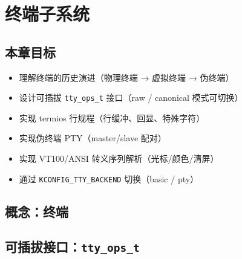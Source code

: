 \chapter{终端子系统}
\label{ch:terminal}

\section{本章目标}

\begin{itemize}
  \item 理解终端的历史演进（物理终端 → 虚拟终端 → 伪终端）
  \item 设计可插拔 \texttt{tty\_ops\_t} 接口（raw / canonical 模式可切换）
  \item 实现 termios 行规程（行缓冲、回显、特殊字符）
  \item 实现伪终端 PTY（master/slave 配对）
  \item 实现 VT100/ANSI 转义序列解析（光标/颜色/清屏）
  \item 通过 \texttt{KCONFIG\_TTY\_BACKEND} 切换（basic / pty）
\end{itemize}

\section{概念：终端}
\label{sec:tty-concept}


\section{可插拔接口：\texttt{tty\_ops\_t}}
\label{sec:tty-interface}

